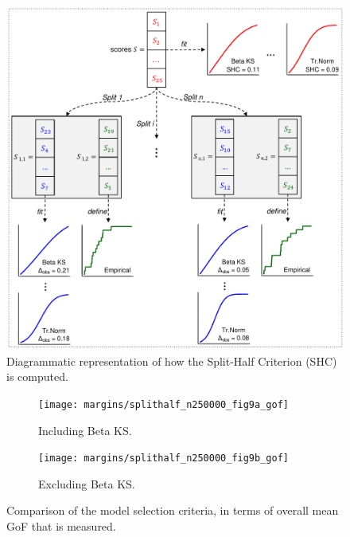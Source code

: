 
\begin{figure}[t]
	\centering	
	\includegraphics[width=0.9\linewidth]{../diagrams/diag4_SHC}
	\caption{Diagrammatic representation of how the Split-Half Criterion (SHC) is computed.}
	\label{fig:SHC_diagram}
\end{figure}

\begin{figure}[!t]
	\begin{subfigure}{1\textwidth}
		\centering
		\texttt{[image: margins/splithalf\_n250000\_fig9a\_gof]}
		\caption{Including Beta KS.}
		\label{fig:margins-splithalf-plot-9a}
	\end{subfigure} \newline
	\begin{subfigure}{1\textwidth}
		\centering
		\hspace*{-.17\textwidth}
		\texttt{[image: margins/splithalf\_n250000\_fig9b\_gof]}
		\caption{Excluding Beta KS.}
		\label{fig:margins-splithalf-plot-9b}
	\end{subfigure}
	\caption{Comparison of the model selection criteria, in terms of overall mean GoF that is measured.}
	\label{fig:margins-splithalf-plot-9}
\end{figure}

